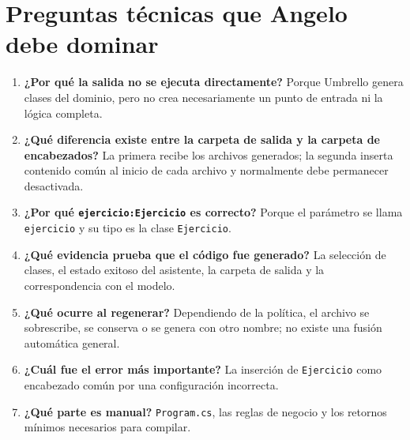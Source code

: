 \section{Preguntas técnicas que Angelo debe dominar}
\begin{enumerate}
  \item \textbf{¿Por qué la salida no se ejecuta directamente?} Porque Umbrello genera clases del dominio, pero no crea necesariamente un punto de entrada ni la lógica completa.
  \item \textbf{¿Qué diferencia existe entre la carpeta de salida y la carpeta de encabezados?} La primera recibe los archivos generados; la segunda inserta contenido común al inicio de cada archivo y normalmente debe permanecer desactivada.
  \item \textbf{¿Por qué \texttt{ejercicio:Ejercicio} es correcto?} Porque el parámetro se llama \texttt{ejercicio} y su tipo es la clase \texttt{Ejercicio}.
  \item \textbf{¿Qué evidencia prueba que el código fue generado?} La selección de clases, el estado exitoso del asistente, la carpeta de salida y la correspondencia con el modelo.
  \item \textbf{¿Qué ocurre al regenerar?} Dependiendo de la política, el archivo se sobrescribe, se conserva o se genera con otro nombre; no existe una fusión automática general.
  \item \textbf{¿Cuál fue el error más importante?} La inserción de \texttt{Ejercicio} como encabezado común por una configuración incorrecta.
  \item \textbf{¿Qué parte es manual?} \texttt{Program.cs}, las reglas de negocio y los retornos mínimos necesarios para compilar.
\end{enumerate}

\printbibliography[title={Referencias}]


